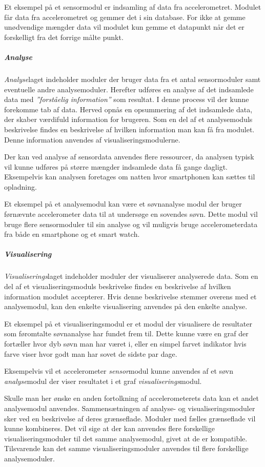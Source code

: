 Et eksempel på et sensormodul er indsamling af data fra accelerometret.
Modulet får data fra accelerometret og gemmer det i sin database. 
For ikke at gemme unødvendige mængder data vil modulet kun gemme et datapunkt når det er forskelligt fra det forrige målte punkt.

\subparagraph{Analyse}
\textit{Analyse}laget indeholder moduler der bruger data fra et antal sensormoduler samt eventuelle andre analysemoduler.
Herefter udføres en analyse af det indsamlede data med \textit{''forståelig information''} som resultat.
I denne process vil der kunne forekomme tab af data.
Herved opnås en opsummering af det indsamlede data, der skaber værdifuld information for brugeren.
Som en del af et analysemoduls beskrivelse findes en beskrivelse af hvilken information man kan få fra modulet.
Denne information anvendes af visualiseringsmodulerne.

Der kan ved analyse af sensordata anvendes flere ressourcer, da analysen typisk vil kunne udføres på større mængder indsamlede data få gange dagligt.
Eksempelvis kan analysen foretages om natten hvor smartphonen kan sættes til opladning.

Et eksempel på et analysemodul kan være et søvnanalyse modul der bruger førnævnte accelerometer data til at undersøge en sovendes søvn.
Dette modul vil bruge flere sensormoduler til sin analyse og vil muligvis bruge accelerometerdata fra både en smartphone og et smart watch.

\subparagraph{Visualisering}
\textit{Visualiserings}laget indeholder moduler der visualiserer analyserede data.
Som en del af et visualiseringsmoduls beskrivelse findes en beskrivelse af hvilken information modulet accepterer.
Hvis denne beskrivelse stemmer overens med et analysemodul, kan den enkelte visualisering anvendes på den enkelte analyse.

Et eksempel på et visualiseringsmodul er et modul der visualisere de resultater som føromtalte søvnanalyse har fundet frem til.
Dette kunne være en graf der fortæller hvor dyb søvn man har været i, eller en simpel farvet indikator hvis farve viser hvor godt man har sovet de sidste par dage.

Eksempelvis vil et accelerometer \textit{sensor}modul kunne anvendes af et søvn \textit{analyse}modul der viser resultatet i et graf \textit{visualiserings}modul.

Skulle man her ønske en anden fortolkning af accelerometerets data kan et andet analysemodul anvendes.
Sammensætningen af analyse- og visualiseringsmoduler sker ved en beskrivelse af deres grænseflade.
Moduler med fælles grænseflade vil kunne kombineres.
Det vil sige at der kan anvendes flere forskellige visualiseringsmoduler til det samme analysemodul, givet at de er kompatible.
Tilsvarende kan det samme visualiseringsmoduler anvendes til flere forskellige analysemoduler.

